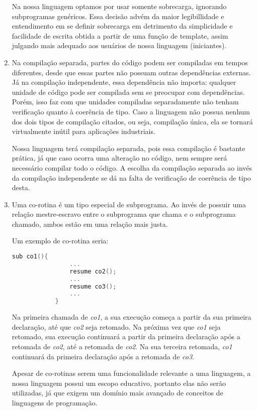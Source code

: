 \documentclass[12pt, a4paper]{article}
\begin{document}
\begin{enumerate}
        Na nossa linguagem optamos por usar somente sobrecarga, ignorando
        subprogramas genéricos. Essa decisão advém da maior legibillidade e
        entendimento em se definir sobrecarga em detrimento da simplicidade e
        facilidade de escrita obtida a partir de uma função de template, assim
        julgando mais adequado aos usuários de nossa linguagem (iniciantes).

        \item
        Na compilação separada, partes do código podem ser compiladas em tempos
        diferentes, desde que essas partes não possuam outras dependências
        externas. Já na compilação independente, essa dependência não importa:
        qualquer unidade de código pode ser compilada sem se preocupar com
        dependências. Porém, isso faz com que unidades compiladas separadamente
        não tenham verificação quanto à coerência de tipo. Caso a linguagem não
        possua nenhum dos dois tipos de compilação citados, ou seja, compilação
        única, ela se tornará virtualmente inútil para aplicações industriais.

        Nossa linguagem terá compilação separada, pois essa compilação é
        bastante prática, já que caso ocorra uma alteração no código, nem sempre
        será necessário compilar todo o código. A escolha da compilação
        separada ao invés da compilação independente se dá na falta de
        verificação de coerência de tipo desta.

        \item
        Uma co-rotina é um tipo especial de subprograma. Ao invés de possuir
        uma relação mestre-escravo entre o subprograma que chama e o
        subprograma chamado, ambos estão em uma relação mais justa.

        Um exemplo de co-rotina seria:
        \begin{lstlisting}[language=C]
            sub co1(){
                ...
                resume co2();
                ...
                resume co3();
                ...
            }
        \end{lstlisting}

        Na primeira chamada de \emph{co1}, a sua execução começa a partir da
        sua primeira declaração, até que \emph{co2} seja retomado. Na próxima
        vez que \emph{co1} seja retomado, sua execução continuará a partir da
        primeira declaração após a retomada de \emph{co2}, até a retomada de
        \emph{co2}. Na sua terceira retomada, \emph{co1} continuará da primeira
        declaração após a retomada de \emph{co3}.

        Apesar de co-rotinas serem uma funcionalidade relevante a uma
        linguagem, a nossa linguagem possui um escopo educativo, portanto elas
        não serão utilizadas, já que exigem um domínio mais avançado de
        conceitos de linguagens de programação.

    \end{enumerate}
\end{document}
